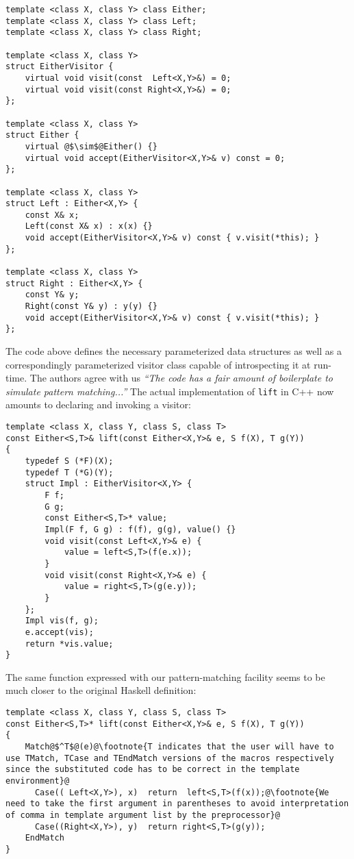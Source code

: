 \documentclass[preprint]{sigplanconf}
\DeclareRobustCommand{\codehaskell}[1]{{\lstinline[breaklines=false,language=Haskell]{#1}}}
\begin{document}
\begin{lstlisting}
template <class X, class Y> class Either;
template <class X, class Y> class Left;
template <class X, class Y> class Right;

template <class X, class Y>
struct EitherVisitor {
    virtual void visit(const  Left<X,Y>&) = 0;
    virtual void visit(const Right<X,Y>&) = 0;
};

template <class X, class Y>
struct Either {
    virtual @$\sim$@Either() {}
    virtual void accept(EitherVisitor<X,Y>& v) const = 0;
};

template <class X, class Y>
struct Left : Either<X,Y> {
    const X& x;
    Left(const X& x) : x(x) {}
    void accept(EitherVisitor<X,Y>& v) const { v.visit(*this); }
};

template <class X, class Y>
struct Right : Either<X,Y> {
    const Y& y;
    Right(const Y& y) : y(y) {}
    void accept(EitherVisitor<X,Y>& v) const { v.visit(*this); }
};
\end{lstlisting}

The code above defines the necessary parameterized data structures as well as a 
correspondingly parameterized visitor class capable of introspecting it at 
run-time. The authors agree with us \emph{``The code has a fair amount of 
boilerplate to simulate pattern matching...''} The actual implementation of 
\codehaskell{lift} in C++ now amounts to declaring and invoking a visitor:

\begin{lstlisting}
template <class X, class Y, class S, class T>
const Either<S,T>& lift(const Either<X,Y>& e, S f(X), T g(Y))
{
    typedef S (*F)(X);
    typedef T (*G)(Y);
    struct Impl : EitherVisitor<X,Y> {
        F f;
        G g;
        const Either<S,T>* value;
        Impl(F f, G g) : f(f), g(g), value() {}
        void visit(const Left<X,Y>& e) {
            value = left<S,T>(f(e.x));
        }
        void visit(const Right<X,Y>& e) {
            value = right<S,T>(g(e.y));
        }
    };
    Impl vis(f, g);
    e.accept(vis);
    return *vis.value;
}
\end{lstlisting}

The same function expressed with our pattern-matching facility seems to be much 
closer to the original Haskell definition:

\begin{lstlisting}[keepspaces,columns=flexible]
template <class X, class Y, class S, class T>
const Either<S,T>* lift(const Either<X,Y>& e, S f(X), T g(Y))
{
    Match@$^T$@(e)@\footnote{T indicates that the user will have to use TMatch, TCase and TEndMatch versions of the macros respectively since the substituted code has to be correct in the template environment}@
      Case(( Left<X,Y>), x)  return  left<S,T>(f(x));@\footnote{We need to take the first argument in parentheses to avoid interpretation of comma in template argument list by the preprocessor}@
      Case((Right<X,Y>), y)  return right<S,T>(g(y));
    EndMatch
}
\end{lstlisting}
\end{document}
